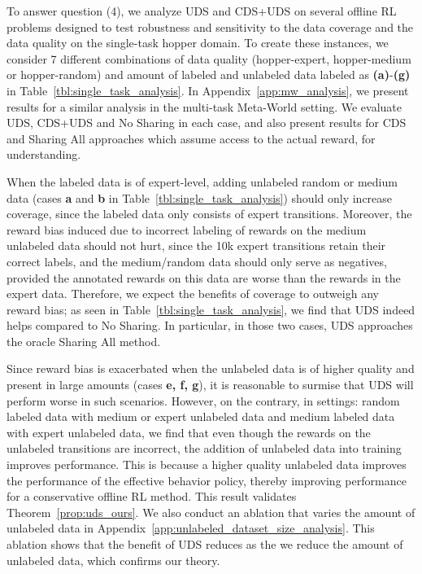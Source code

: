 To answer question (4), we analyze UDS and CDS+UDS on several offline RL problems designed to test robustness and sensitivity to the data coverage and the data quality on the single-task hopper domain. To create these instances, we consider 7 different combinations of data quality ({hopper-expert}, {hopper-medium} or {hopper-random}) and amount of labeled and unlabeled data labeled as \textbf{(a)}-\textbf{(g)} in Table~\ref{tbl:single_task_analysis}. In Appendix~\ref{app:mw_analysis}, we present results for a similar analysis in the multi-task Meta-World setting. We evaluate UDS, CDS+UDS and No Sharing in each case, and also present results for CDS and Sharing All approaches which assume access to the actual reward, for understanding. 


When the labeled data is of expert-level, adding unlabeled random or medium data (cases \textbf{a} and \textbf{b} in Table~\ref{tbl:single_task_analysis}) should only increase coverage, since the labeled data only consists of expert transitions. Moreover, the reward bias induced due to incorrect labeling of rewards on the medium unlabeled data should not hurt, since the 10k expert transitions retain their correct labels, and the medium/random data should only serve as negatives, provided the annotated rewards on this data are worse than the rewards in the expert data. Therefore, we expect the benefits of coverage to outweigh any reward bias; as seen in Table~\ref{tbl:single_task_analysis}, we find that UDS indeed helps compared to No Sharing. In particular, in those two cases, UDS approaches the oracle Sharing All method. 

Since reward bias is exacerbated when the unlabeled data is of higher quality and present in large amounts (cases \textbf{e, f, g}), it is reasonable to surmise that UDS will perform worse in such scenarios. However, on the contrary, in settings: random labeled data with medium or expert unlabeled data and medium labeled data with expert unlabeled data, we find that even though the rewards on the unlabeled transitions are incorrect, the addition of unlabeled data into training improves performance. This is because a higher quality unlabeled data improves the performance of the effective behavior policy, thereby improving performance for a conservative offline RL method. This result validates Theorem~\ref{prop:uds_ours}. 
We also conduct an ablation that varies the amount of unlabeled data in Appendix~\ref{app:unlabeled_dataset_size_analysis}. This ablation shows that the benefit of UDS reduces as the we reduce the amount of unlabeled data, which confirms our theory.

